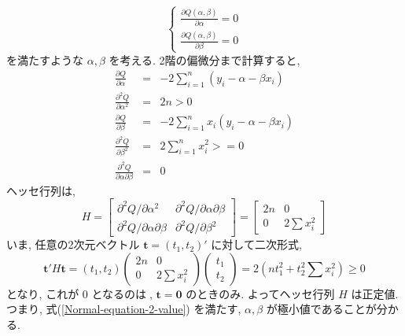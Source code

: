 \documentclass{jsarticle}
\theoremstyle{plain}
\begin{document}
  \begin{equation}
  \label{Normal-equation-2-value}
    \begin{cases}
      \frac{\partial Q(\alpha, \beta)}{\partial \alpha} = 0 \\
      \frac{\partial Q(\alpha, \beta)}{\partial \beta} = 0
    \end{cases}
  \end{equation}
  を満たすような $\alpha, \beta$ を考える. 2階の偏微分まで計算すると,
  \begin{eqnarray}
    \frac{\partial Q}{\partial \alpha} &=& -2 \sum_{i=1}^n (y_i - \alpha - \beta x_i) \\
    \frac{\partial^2 Q}{\partial \alpha^2} &=& 2n > 0 \\
    \frac{\partial Q}{\partial \beta} &=& -2\sum_{i=1}^n x_i (y_i - \alpha - \beta x_i) \\
    \frac{\partial^2 Q}{\partial \beta^2} &=& 2 \sum_{i=1}^n x_i^2 >= 0 \\
    \frac{\partial^2 Q}{\partial \alpha \partial \beta} &=& 0
  \end{eqnarray}
  ヘッセ行列は,
  \begin{equation}
    H = 
    \left[
      \begin{array}{cc}
        \partial^2 Q / \partial \alpha^2 & \partial^2 Q/\partial \alpha \partial \beta \\
        \partial^2 Q/\partial \alpha \partial \beta & \partial^2 Q / \partial \beta^2
      \end{array}
    \right]
    = \left[
      \begin{array}{cc}
        2n & 0 \\
        0 & 2 \sum x_i^2
      \end{array}
    \right]
  \end{equation}
  いま, 任意の2次元ベクトル $\bm{t} = (t_1, t_2)'$ に対して二次形式,
  \begin{equation}
    \bm{t}'H\bm{t} = (t_1, t_2) \left(
      \begin{array}{cc}
        2n & 0 \\
        0 & 2 \sum x_i^2
      \end{array}
    \right) \left( 
      \begin{array}{c}
        t_1 \\
        t_2
      \end{array}
    \right) = 2(nt_1^2 + t_2^2 \sum x_i^2) \geq 0
  \end{equation}
  となり, これが $0$ となるのは, $\bm{t}=\bm{0}$ のときのみ. よってヘッセ行列 $H$ は正定値. つまり, 式(\ref{Normal-equation-2-value}) を満たす,
  $\alpha, \beta$ が極小値であることが分かる.
  \appendix
\end{document}

